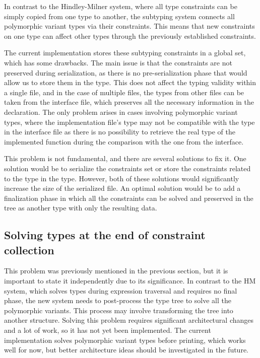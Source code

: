 \documentclass[a4paper,11pt,oneside]{article}
\theoremstyle{definition}
\begin{document}
In contrast to the Hindley-Milner system, where all type constraints can
be simply copied from one type to another, the subtyping system connects
all polymorphic variant types via their constraints. This means that new
constraints on one type can affect other types through the previously
established constraints.

The current implementation stores these subtyping constraints in a global
set, which has some drawbacks. The main issue is that the constraints are
not preserved during serialization, as there is no pre-serialization phase
that would allow us to store them in the type. This does not affect the
typing validity within a single file, and in the case of multiple files,
the types from other files can be taken from the interface file, which
preserves all the necessary information in the declaration. The only problem
arises in cases involving polymorphic variant types, where the implementation
file's type may not be compatible with the type in the interface file as there
is no possibility to retrieve the real type of the implemented function during
the comparison with the one from the interface.

This problem is not fundamental, and there are several solutions to fix it.
One solution would be to serialize the constraints set or store the constraints
related to the type in the type. However, both of these solutions would
significantly increase the size of the serialized file. An optimal solution
would be to add a finalization phase in which all the constraints can be
solved and preserved in the tree as another type with only the resulting data.

\subsection{Solving types at the end of constraint collection}

This problem was previously mentioned in the previous section, but it is
important to state it independently due to its significance. In contrast
to the HM system, which solves types during expression traversal and
requires no final phase, the new system needs to post-process the type
tree to solve all the polymorphic variants. This process may involve
transforming the tree into another structure. Solving this problem requires
significant architectural changes and a lot of work, so it has not yet been
implemented. The current implementation solves polymorphic variant types
before printing, which works well for now, but better architecture ideas
should be investigated in the future.
\end{document}
